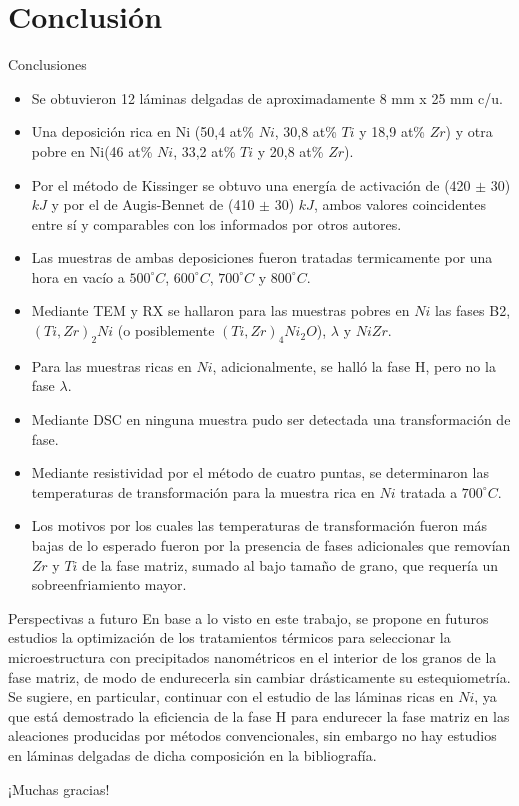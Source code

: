 \documentclass[11pt]{beamer}
\begin{document}
\section{Conclusión}
	\begin{frame}[allowframebreaks]{Conclusiones}
		\begin{itemize}
			\item Se obtuvieron 12 láminas delgadas de aproximadamente 8 mm x 25 mm c/u.
			\item Una deposición rica en Ni (50,4 at\% $Ni$, 30,8 at\% $Ti$ y 18,9 at\% $Zr$) y otra pobre en Ni(46 at\% $Ni$, 33,2 at\% $Ti$ y 20,8 at\% $Zr$).
			\item Por el método de Kissinger se obtuvo una energía de activación de (420 $\pm$ 30) $kJ$ y por el de Augis-Bennet de (410 $\pm$ 30) $kJ$, ambos valores coincidentes entre sí y comparables con los informados por otros autores.
			\item Las muestras de ambas deposiciones fueron tratadas termicamente por una hora en vacío a $500^\circ C$, $600^\circ C$, $700^\circ C$ y $800^\circ C$.
			\item Mediante TEM y RX se hallaron para las muestras pobres en $Ni$ las fases B2, $(Ti, Zr)_2Ni$ (o posiblemente $(Ti, Zr)_4Ni_2O$), $\lambda$ y $NiZr$.
			\item Para las muestras ricas en $Ni$, adicionalmente, se halló la fase H, pero no la fase $\lambda$.
			\item Mediante DSC en ninguna muestra pudo ser detectada una transformación de fase.
			\item Mediante resistividad por el método de cuatro puntas, se determinaron las temperaturas de transformación para la muestra rica en $Ni$ tratada a $700^\circ C$.
			\item Los motivos por los cuales las temperaturas de transformación fueron más bajas de lo esperado fueron por la presencia de fases adicionales que removían $Zr$ y $Ti$ de la fase matriz, sumado al bajo tamaño de grano, que requería un sobreenfriamiento mayor.
		\end{itemize}
	\end{frame}
	
	\begin{frame}{Perspectivas a futuro}
En base a lo visto en este trabajo, se propone en futuros estudios la optimización de los tratamientos térmicos para seleccionar la microestructura con precipitados nanométricos en el interior de los granos de la fase matriz, de modo de endurecerla sin cambiar drásticamente su estequiometría. Se sugiere, en particular, continuar con el estudio de las láminas ricas en $Ni$, ya que está demostrado la eficiencia de la fase H para endurecer la fase matriz en las aleaciones producidas por métodos convencionales, sin embargo no hay estudios en láminas delgadas de dicha composición en la bibliografía.	
\end{frame}
\begin{frame}
	¡Muchas gracias!
\end{frame}
\end{document}
